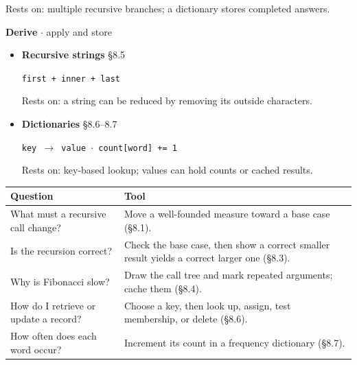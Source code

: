 \documentclass[11pt]{article}
\begin{document}
\begin{keepsection}
\begin{itemize}
Rests on: multiple recursive branches; a dictionary stores completed answers.
\end{itemize}

\textbf{Derive} \ensuremath{\cdot} apply and store

\begin{itemize}
\item {}
\textbf{Recursive strings} \hfill{\small\color{FAUblue}§8.5}

\texttt{first + inner + last}

Rests on: a string can be reduced by removing its outside characters.
\item {}
\textbf{Dictionaries} \hfill{\small\color{FAUblue}§8.6–8.7}

\texttt{key \ensuremath{\to} value \ensuremath{\cdot} count[word] += 1}

Rests on: key-based lookup; values can hold counts or cached results.
\end{itemize}

\begin{center}\small\begin{tabularx}{\linewidth}{>{\raggedright\arraybackslash}X>{\raggedright\arraybackslash}X}\toprule
\textbf{Question} & \textbf{Tool} \\ \midrule
What must a recursive call change? & Move a well-founded measure toward a base case (§8.1). \\
Is the recursion correct? & Check the base case, then show a correct smaller result yields a correct larger one (§8.3). \\
Why is Fibonacci slow? & Draw the call tree and mark repeated arguments; cache them (§8.4). \\
How do I retrieve or update a record? & Choose a key, then look up, assign, test membership, or delete (§8.6). \\
How often does each word occur? & Increment its count in a frequency dictionary (§8.7). \\
\bottomrule\end{tabularx}\end{center}
\end{keepsection}
\end{document}
